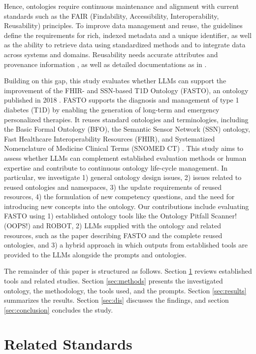 \documentclass[
]{ceurart}
\begin{document}
Hence, ontologies require continuous maintenance and alignment with current standards such as the FAIR (Findability, Accessibility, Interoperability, Reusability) principles. To improve data management and reuse, the guidelines define the requirements for rich, indexed metadata and a unique identifier, as well as the ability to retrieve data using standardized methods and to integrate data across systems and domains. Reusability needs accurate attributes and provenance information \cite{tuozzo2026automated,Bernab2023}, as well as detailed documentations as in \cite{burbach2025aiship, Ivanovic2025SHIP, Doerner2026MQTT}.

Building on this gap, this study evaluates whether LLMs can support the improvement of the FHIR- and SSN-based T1D Ontology (FASTO), an ontology published in 2018 \cite{ElSappagh2019_FASTO}. FASTO supports the diagnosis and management of type 1 diabetes (T1D) by enabling the generation of long-term and emergency personalized therapies. It reuses standard ontologies and terminologies, including the Basic Formal Ontology (BFO), the Semantic Sensor Network (SSN) ontology, Fast Healthcare Interoperability Resources (FHIR), and Systematized Nomenclature of Medicine Clinical Terms (SNOMED CT) \cite{ElSappagh2019_FASTO}. This study aims to assess whether LLMs can complement established evaluation methods or human expertise and contribute to continuous ontology life-cycle management. In particular, we investigate 1) general ontology design issues, 2) issues related to reused ontologies and namespaces, 3) the update requirements of reused resources, 4) the formulation of new competency questions, and the need for introducing new concepts into the ontology. Our contributions include evaluating FASTO using 1) established ontology tools like the Ontology Pitfall Scanner! (OOPS!) and ROBOT, 2) LLMs supplied with the ontology and related resources, such as the paper describing FASTO and the complete reused ontologies, and 3) a hybrid approach in which outputs from established tools are provided to the LLMs alongside the prompts and ontologies.

The remainder of this paper is structured as follows. Section \ref{sec:stota} reviews established tools and related studies. Section \ref{sec:methods} presents the investigated ontology, the methodology, the tools used, and the prompts. Section \ref{sec:results} summarizes the results. Section \ref{sec:dis} discusses the findings, and section \ref{sec:conclusion} concludes the study.

\section{Related Standards}
\label{sec:stota}
\end{document}

